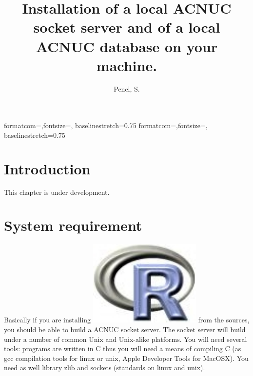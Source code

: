 \documentclass{article}
\title{Installation of a local ACNUC socket server and of a local ACNUC database on your machine.}
\author{Penel, S.}
\begin{document}
%
%
{formatcom={\color{Sinput}},fontsize=\footnotesize, baselinestretch=0.75}
{formatcom={\color{Soutput}},fontsize=\footnotesize, baselinestretch=0.75}
%
%
\renewenvironment{Schunk}{\vspace{\topsep}}{\vspace{\topsep}}
%
%
\newcommand{\Rlogo}{\protect\includegraphics[height=1.8ex,keepaspectratio]{../figs/Rlogo.pdf}}
%
%
\newcommand{\seqinr}{\texttt{seqin\bf{R}}}
\newcommand{\Seqinr}{\texttt{Seqin\bf{R}}}
%
%
%
%
%


\maketitle
\tableofcontents



\section{Introduction}

This chapter is under development.

\section{System requirement}

Basically if you are installing \Rlogo{} from the
sources, you should be able to build a ACNUC socket server.
The socket server will build under a number of common Unix and Unix-alike
platforms. You will need several tools: programs are written in C thus 
you will need a
means of compiling C (as gcc compilation tools for linux or unix, Apple
Developer Tools  for MacOSX). You need as well library zlib and sockets
(standards on linux and unix).
\end{document}
